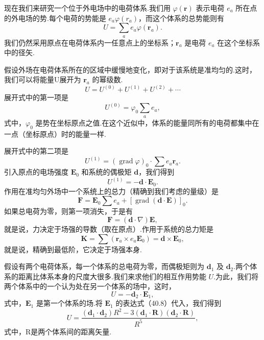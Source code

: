 现在我们来研究一个位于外电场中的电荷体系.我们用 $\varphi(\boldsymbol{r})$ 表示电荷 $e_a$ 所在点的外电场的势.每个电荷的势能是 $e_a\varphi(r_a)$，而这个体系的总势能则有
\begin{equation}
  U=\sum_a e_a\varphi(\boldsymbol{r}_a).
\end{equation}
我们仍然采用原点在电荷体系内一任意点上的坐标系；$\boldsymbol{r}_a$ 是电荷 $e_a$ 在这个坐标系中的径矢.

假设外场在电荷体系所在的区域中缓慢地变化，即对于该系统是准均匀的.这时，我们可以将能量U展开为 $\boldsymbol{r}_a$ 的幂级数.
\begin{equation}
  U=U^{(0)}+U^{(1)}+U^{(2)}+\cdots
\end{equation}
展开式中的第一项是
\begin{equation}
  U^{(0)}=\varphi_0\sum_a e_a,
\end{equation}
式中，$\varphi_0$ 是势在坐标原点之值.在这个近似中，体系的能量同所有的电荷都集中在一点（坐标原点）时的能量一样.

展开式中的第二项是
\begin{equation*}
  U^{(1)}=(\operatorname{grad}\varphi)_0\cdot\sum e_a\boldsymbol{r}_a.
\end{equation*}
引入原点的电场强度 $\boldsymbol{E}_0$ 和系统的偶极矩 $\boldsymbol{d}$，我们得到
\begin{equation}
  U^{(1)}=-\boldsymbol{d}\cdot\boldsymbol{E}_0.
\end{equation}
作用在准均匀外场中一个系统上的总力（精确到我们考虑的量级）是
\begin{equation*}
  \boldsymbol{F}=\boldsymbol{E}_0\sum e_a+[\operatorname{grad}(\boldsymbol{d}\cdot\boldsymbol{E})]_0.
\end{equation*}
如果总电荷为零，则第一项消失，于是有
\begin{equation}
  \boldsymbol{F}=(\boldsymbol{d}\cdot\nabla)\boldsymbol{E},
\end{equation}
就是说，力决定于场强的导数（取在原点）.作用于系统的总力矩是
\begin{equation}
  \boldsymbol{K}=\sum(\boldsymbol{r}_a\times e_a\boldsymbol{E}_0)
  =\boldsymbol{d}\times\boldsymbol{E}_0,
\end{equation}
就是说，精确到最低阶，它决定于场强本身.

假设有两个电荷体系，每一个体系的总电荷为零，而偶极矩则为 $\boldsymbol{d}_1$ 及 $\boldsymbol{d}_2$.两个体系的距离比体系本身的尺度大很多.我们来求他们的相互作用势能 $U$.为此，我们将两个体系中的一个认为处在另一个体系的场中，这时，
\begin{equation*}
  U=-\boldsymbol{d}_2\cdot\boldsymbol{E}_1,
\end{equation*}
式中，$\boldsymbol{E}_1$ 是第一个体系的场.将 $\boldsymbol{E}_1$ 的表达式（40.8）代入，我们得到
\begin{equation}
  U=\frac{(\boldsymbol{d}_1\cdot\boldsymbol{d}_2)R^2
  -3(\boldsymbol{d}_1\cdot\boldsymbol{R})(\boldsymbol{d}_2\cdot\boldsymbol{R})}{R^5},
\end{equation}
式中，R是两个体系间的距离矢量.

